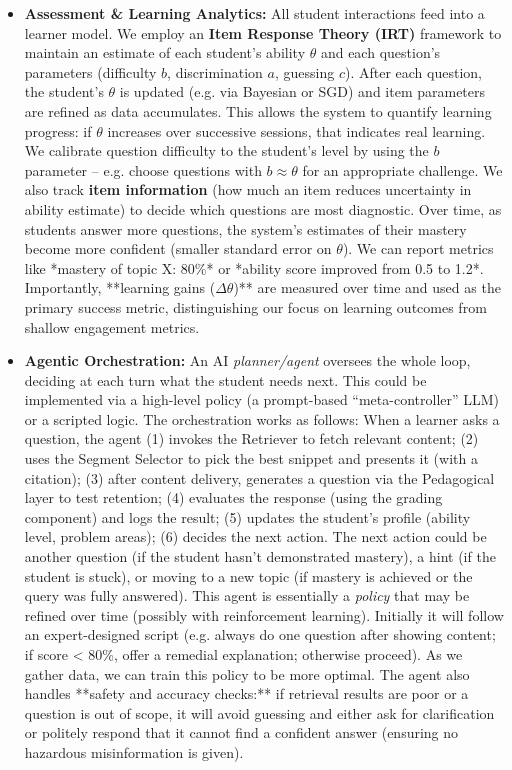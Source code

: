 \documentclass[11pt]{article}
\begin{document}
\begin{itemize}
  \item \textbf{Assessment \& Learning Analytics:} All student interactions feed into a learner model. We employ an \textbf{Item Response Theory (IRT)} framework to maintain an estimate of each student’s ability $\theta$ and each question’s parameters (difficulty $b$, discrimination $a$, guessing $c$). After each question, the student’s $\theta$ is updated (e.g. via Bayesian or SGD) and item parameters are refined as data accumulates. This allows the system to quantify learning progress: if $\theta$ increases over successive sessions, that indicates real learning. We calibrate question difficulty to the student’s level by using the $b$ parameter – e.g. choose questions with $b \approx \theta$ for an appropriate challenge. We also track \textbf{item information} (how much an item reduces uncertainty in ability estimate) to decide which questions are most diagnostic. Over time, as students answer more questions, the system’s estimates of their mastery become more confident (smaller standard error on $\theta$). We can report metrics like *mastery of topic X: 80\%* or *ability score improved from 0.5 to 1.2*. Importantly, **learning gains ($\Delta \theta$)** are measured over time and used as the primary success metric, distinguishing our focus on learning outcomes from shallow engagement metrics.
  \item \textbf{Agentic Orchestration:} An AI \textit{planner/agent} oversees the whole loop, deciding at each turn what the student needs next. This could be implemented via a high-level policy (a prompt-based “meta-controller” LLM) or a scripted logic. The orchestration works as follows: When a learner asks a question, the agent (1) invokes the Retriever to fetch relevant content; (2) uses the Segment Selector to pick the best snippet and presents it (with a citation); (3) after content delivery, generates a question via the Pedagogical layer to test retention; (4) evaluates the response (using the grading component) and logs the result; (5) updates the student’s profile (ability level, problem areas); (6) decides the next action. The next action could be another question (if the student hasn’t demonstrated mastery), a hint (if the student is stuck), or moving to a new topic (if mastery is achieved or the query was fully answered). This agent is essentially a \textit{policy} that may be refined over time (possibly with reinforcement learning). Initially it will follow an expert-designed script (e.g. always do one question after showing content; if score < 80\%, offer a remedial explanation; otherwise proceed). As we gather data, we can train this policy to be more optimal. The agent also handles **safety and accuracy checks:** if retrieval results are poor or a question is out of scope, it will avoid guessing and either ask for clarification or politely respond that it cannot find a confident answer (ensuring no hazardous misinformation is given).
\end{itemize}
\end{document}
